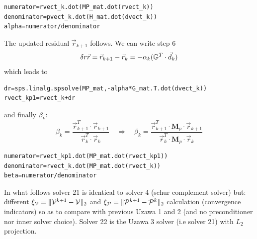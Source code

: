 \begin{lstlisting}
numerator=rvect_k.dot(MP_mat.dot(rvect_k))     
denominator=pvect_k.dot(H_mat.dot(dvect_k))   
alpha=numerator/denominator                  
\end{lstlisting}
The updated residual $\vec{r}_{k+1}$ follows. 
We can write step 6 
\[
\delta r\vec{r} = \vec{r}_{k+1} - \vec{r}_k = - \alpha_k ({\mathbb{G}}^T \cdot \vec{d}_k ) 
\]
which leads to
\begin{lstlisting}
dr=sps.linalg.spsolve(MP_mat,-alpha*G_mat.T.dot(dvect_k)) 
rvect_kp1=rvect_k+dr     
\end{lstlisting}
and finally $\beta_k$:
\[
\beta_k= \frac{ \vec{r}_{k+1}^T \cdot \vec{r}_{k+1} } { \vec{r}_k^T \cdot \vec{r}_k }
\quad
\Rightarrow
\quad
\beta_k= \frac{ \vec{r}_{k+1}^T \cdot {\bm M}_p \cdot \vec{r}_{k+1} }
{ \vec{r}_k^T \cdot {\bm M}_p \cdot \vec{r}_k }
\]
\begin{lstlisting}
numerator=rvect_kp1.dot(MP_mat.dot(rvect_kp1)) 
denominator=rvect_k.dot(MP_mat.dot(rvect_k))  
beta=numerator/denominator                   
\end{lstlisting}

In what follows solver 21 is identical to solver 4 (schur complement solver) but: 
different $\xi_{\cal V}=\|{\cal V}^{k+1}-{\cal V}\|_2$ and 
$\xi_{\cal P}=\|{\cal P}^{k+1}-{\cal P}^k\|_2$ calculation (convergence indicators) so as to 
compare with previous Uzawa 1 and 2 (and no preconditioner nor inner solver choice). 
Solver 22 is the Uzawa 3 solver (i.e solver 21) with $L_2$ projection.

